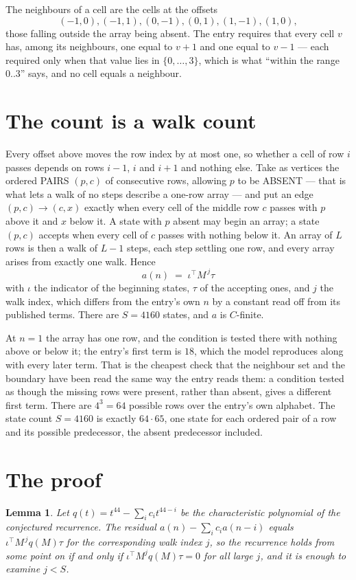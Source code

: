 \documentclass[11pt,a4paper]{article}
\theoremstyle{plain}
\newtheorem{lemma}[theorem]{Lemma}
\theoremstyle{definition}
\begin{document}
The neighbours of a cell are the cells at the offsets
\[
(-1,0), (-1,1), (0,-1), (0,1), (1,-1), (1,0),
\]
those falling outside the array being absent. The entry requires that every cell $v$ has, among its neighbours, one equal to $v+1$ and one equal to $v-1$ --- each required only when that value lies in $\{0,\dots,3\}$, which is what ``within the range $0..3$'' says, and no cell equals a neighbour.

\section{The count is a walk count}

Every offset above moves the row index by at most one, so whether a cell of row $i$ passes
depends on rows $i-1$, $i$ and $i+1$ and nothing else. Take as vertices the ordered PAIRS
$(p,c)$ of consecutive rows, allowing $p$ to be ABSENT --- that is what lets a walk of no steps
describe a one-row array --- and put an edge $(p,c)\to(c,x)$ exactly when every cell of the
middle row $c$ passes with $p$ above it and $x$ below it. A state with $p$ absent may begin an
array; a state $(p,c)$ accepts when every cell of $c$ passes with nothing below it. An array of
$L$ rows is then a walk of $L-1$ steps, each step settling one row, and every array arises from
exactly one walk. Hence
\[
a(n)\;=\;\iota^{\!\top}M^{\,j}\tau
\]
with $\iota$ the indicator of the beginning states, $\tau$ of the accepting ones, and $j$ the
walk index, which differs from the entry's own $n$ by a constant read off from its published
terms. There are $S=4160$ states, and $a$ is $C$-finite.

At $n=1$ the array has one row, and
the condition is tested there with nothing above or below it; the entry's first term is
$18$, which the model reproduces along with every later term. That is the cheapest check
that the neighbour set and the boundary have been read the same way the entry reads them: a
condition tested as though the missing rows were present, rather than absent, gives a different
first term. There are $4^{3}=64$ possible rows over the entry's own alphabet. The state count $S=4160$ is exactly $64\cdot65$,
one state for each ordered pair of a row and its possible predecessor, the absent predecessor
included.

\section{The proof}

\begin{lemma}\label{lem:crit}
Let $q(t)=t^{44}-\sum_i c_it^{44-i}$ be the characteristic polynomial of the
conjectured recurrence. The residual $a(n)-\sum_ic_ia(n-i)$ equals
$\iota^{\!\top}M^{\,j}q(M)\tau$ for the corresponding walk index $j$, so the recurrence
holds from some point on if and only if $\iota^{\!\top}M^{j}q(M)\tau=0$ for all large $j$,
and it is enough to examine $j<S$.
\end{lemma}
\end{document}

